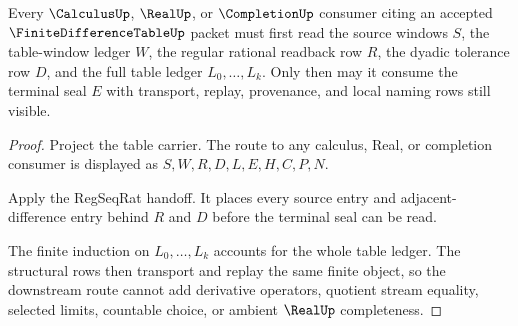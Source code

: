 \begin{theorem}
\label{thm:finite-difference-table-calculus-completion-route}
Every $\CalculusUp$, $\RealUp$, or $\CompletionUp$ consumer citing an accepted $\FiniteDifferenceTableUp$ packet must first read the source windows $S$, the table-window ledger $W$, the regular rational readback row $R$, the dyadic tolerance row $D$, and the full table ledger $L_0,\ldots,L_k$. Only then may it consume the terminal seal $E$ with transport, replay, provenance, and local naming rows still visible.
\end{theorem}
\begin{proof}
Project the table carrier. The route to any calculus, Real, or completion consumer is displayed as $S,W,R,D,L,E,H,C,P,N$.

Apply the RegSeqRat handoff. It places every source entry and adjacent-difference entry behind $R$ and $D$ before the terminal seal can be read.

The finite induction on $L_0,\ldots,L_k$ accounts for the whole table ledger. The structural rows then transport and replay the same finite object, so the downstream route cannot add derivative operators, quotient stream equality, selected limits, countable choice, or ambient $\RealUp$ completeness.
\end{proof}




